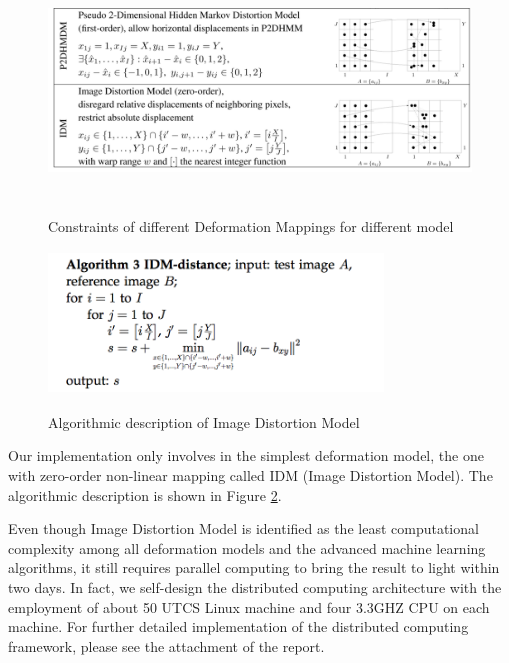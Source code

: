 \documentclass{article} %
\begin{document}
\begin{figure}[h]  
\begin{center}
    \includegraphics[width=5.5in,height=2.25in]{./images/NMAP.png} \\
    \caption{Constraints of different Deformation Mappings for different model} 
    \label{NMAP}
\end{center}
\end{figure}

\begin{figure}[h] 
\begin{center}
    \includegraphics[width=3.5in,height=1.5in]{./images/IDM.png} \\
    \caption{Algorithmic description of Image Distortion Model} 
    \label{IDM}
\end{center}
\end{figure}
Our implementation only involves in the simplest deformation model, the one
with zero-order non-linear mapping called IDM (Image Distortion Model). The
algorithmic description is shown in Figure \ref{IDM}.

Even though Image Distortion Model is identified as the least computational
complexity among all deformation models and the advanced machine learning
algorithms, it still requires parallel computing to bring the result to light
within two days. In fact, we self-design the distributed computing
architecture with the employment of about 50 UTCS Linux machine and four
3.3GHZ CPU on each machine. For further detailed implementation of the
distributed computing framework, please see the attachment of the report.  
\end{document}
